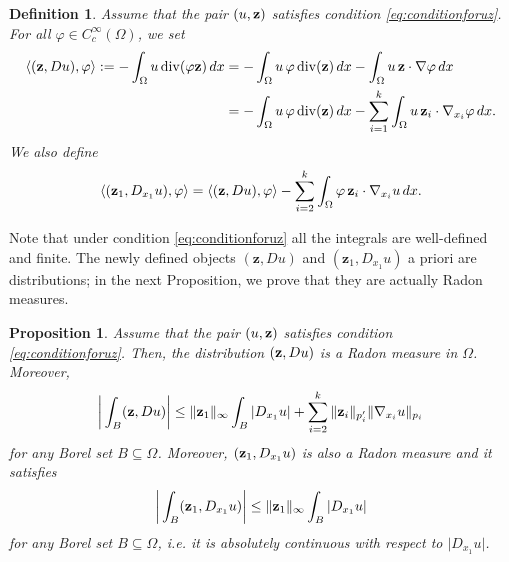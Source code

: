 \documentclass[reqno,12pt]{amsart}
\def\z{{\bf z}}
\newtheorem{definition}[theorem]{Definition}
\newtheorem{proposition}[theorem]{Proposition}
\numberwithin{equation}{section}
\begin{document}
\begin{definition}\label{dfn:anzellottipairing}
Assume that the pair $(u,\z)$ satisfies condition \eqref{eq:conditionforuz}. For all $\varphi \in C_c^\infty(\Omega)$, we set
\begin{align}
\langle (\z, Du), \varphi \rangle := -\int_{\Omega} u \, \mathrm{div}(\varphi \z) \, dx &= - \int_\Omega u \, \varphi \, \mathrm{div}(\z) \, dx - \int_\Omega u \, \z \cdot \nabla \varphi \, dx \\
&= - \int_\Omega u \, \varphi \, \mathrm{div}(\z) \, dx - \sum_{i = 1}^k \int_\Omega u \, \z_i \cdot \nabla_{x_i} \varphi \, dx.
\end{align}
We also define
\begin{equation}
\langle (\z_1, D_{x_1} u), \varphi \rangle = \langle (\z, Du), \varphi \rangle - \sum_{i = 2}^k \int_\Omega \varphi \, \z_i \cdot \nabla_{x_i} u \, dx. 
\end{equation}
\end{definition}

Note that under condition \eqref{eq:conditionforuz} all the integrals are well-defined and finite. The newly defined objects $(\mathbf{z},Du)$ and $(\mathbf{z}_1, D_{x_1} u)$ a priori are distributions; in the next Proposition, we prove that they are actually Radon measures.

\begin{proposition}\label{prop:propertiesofanzellottipairing}
Assume that the pair $(u,\z)$ satisfies condition \eqref{eq:conditionforuz}. Then, the distribution $(\z,Du)$ is a Radon measure in $\Omega$. Moreover,
\begin{equation}
\bigg\vert \int_{B} (\z,Du) \bigg\vert \leq \| \z_1 \|_{\infty} \int_{B} \vert D_{x_1} u \vert + \sum_{i=2}^k \| \z_i \|_{p'_i} \| \nabla_{x_i} u \|_{p_i}
\end{equation}
for any Borel set $B \subseteq \Omega$. Moreover, $(\z_1, D_{x_1} u)$ is also a Radon measure and it satisfies
\begin{equation}
\bigg\vert \int_B (\z_1, D_{x_1} u) \bigg\vert \leq \| \z_1 \|_{\infty} \int_B |D_{x_1} u|
\end{equation}
for any Borel set $B \subseteq \Omega$, i.e. it is absolutely continuous with respect to $\vert D_{x_1} u \vert$.
\end{proposition}
\end{document}
